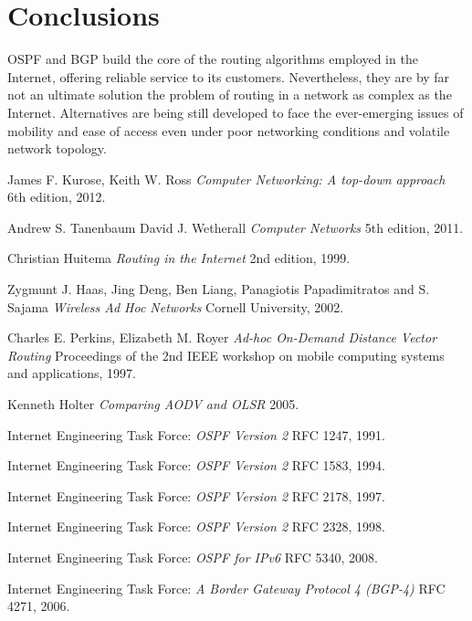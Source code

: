\documentclass{acm_proc_article-sp}
\begin{document}
\section{Conclusions}

OSPF and BGP build the core of the routing algorithms employed in the Internet, offering reliable service to its customers. Nevertheless, they are by far not an ultimate solution the problem of routing in a network as complex as the Internet. Alternatives are being still developed to face the ever-emerging issues of mobility and ease of access even under poor networking conditions and volatile network topology.

\begin{thebibliography}{1}

   James F. Kurose, Keith W. Ross {\em Computer Networking: A top-down approach}  6th edition, 2012.

    Andrew S. Tanenbaum David J. Wetherall {\em Computer Networks} 5th edition, 2011.

    Christian Huitema {\em Routing in the Internet} 2nd edition, 1999.
  
   Zygmunt J. Haas, Jing Deng, Ben Liang, Panagiotis Papadimitratos and S. Sajama {\em Wireless Ad Hoc Networks } Cornell University, 2002.

    Charles E. Perkins, Elizabeth M. Royer {\em Ad-hoc On-Demand Distance Vector Routing} Proceedings of the 2nd IEEE workshop on mobile computing systems and applications, 1997.
  
   Kenneth Holter {\em Comparing AODV and OLSR} 2005. 

   Internet Engineering Task Force: {\em OSPF Version 2} RFC 1247, 1991.
  
   Internet Engineering Task Force: {\em OSPF Version 2} RFC 1583, 1994.
  
   Internet Engineering Task Force: {\em OSPF Version 2} RFC 2178, 1997.
  
   Internet Engineering Task Force: {\em OSPF Version 2} RFC 2328, 1998.
  
   Internet Engineering Task Force: {\em OSPF for IPv6} RFC 5340, 2008.
  
   Internet Engineering Task Force: {\em A Border Gateway Protocol 4 (BGP-4)} RFC 4271, 2006.
  
  \end{thebibliography}
\end{document}
